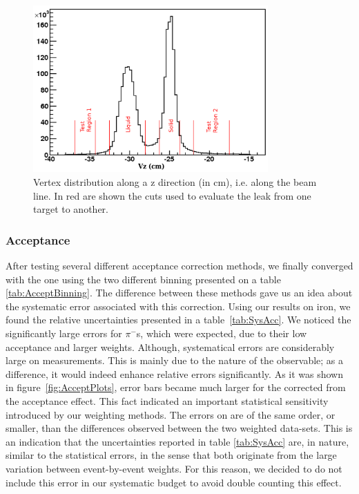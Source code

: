 \begin{figure}[tbp]
\centering
\includegraphics[width=9cm] {chap5-fig/Vertex.png}
\caption {Vertex distribution along a z direction (in cm), i.e. along the 
beam line. In red are shown the cuts used to evaluate the leak from one target to 
another.}
\label{fig:targetleak}
\end{figure}

\subsubsection{Acceptance}

After testing several different acceptance correction methods, we finally converged with the one using the two different binning presented on a table \ref{tab:AcceptBinning}. The difference between these methods gave us an idea about the systematic error associated with this correction. Using our results on iron, we found the relative uncertainties presented in a table~\ref{tab:SysAcc}. We noticed the significantly large errors for $\pi^-$s, which were expected, due to their low acceptance and larger weights. Although, systematical errors are considerably large on \dpt measurements. This is mainly due to the nature of the \dpt observable; as a difference, it would indeed enhance relative errors significantly. As it was shown in figure~\ref{fig:AcceptPlots}, error bars became much larger for the corrected \dpt from the acceptance effect. This fact indicated an important statistical sensitivity introduced by our weighting methods. The errors on \dpt are of the same order, or smaller, than the differences observed between the two weighted data-sets. This is an indication that the uncertainties reported in table \ref{tab:SysAcc} are, in nature, similar to the statistical errors, in the sense that both originate from the large variation between event-by-event weights. For this reason, we decided to do not include this error in our systematic budget to avoid double counting this effect.

